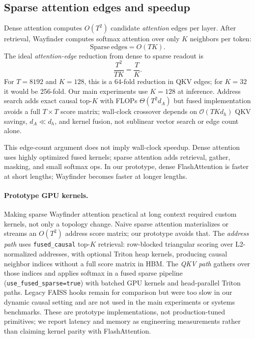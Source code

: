 \documentclass{article}
\begin{document}
\subsection{Sparse attention edges and speedup}

Dense attention computes $O(T^2)$ candidate \emph{attention} edges per layer. After retrieval, Wayfinder computes softmax attention over only $K$ neighbors per token:
\begin{equation}
\mathrm{Sparse\ edges} = O(TK).
\end{equation}
The ideal \emph{attention-edge} reduction from dense to sparse readout is
\begin{equation}
\frac{T^2}{TK} = \frac{T}{K}.
\end{equation}
For $T=8192$ and $K=128$, this is a 64-fold reduction in QKV edges; for $K=32$ it would be 256-fold. Our main experiments use $K=128$ at inference. Address search adds exact causal top-$K$ with FLOPs $\Theta(T^2 d_A)$ but fused implementation avoids a full $T \times T$ score matrix; wall-clock crossover depends on $\mathcal{O}(T K d_h)$ QKV savings, $d_A \ll d_h$, and kernel fusion, not sublinear vector search or edge count alone.

This edge-count argument does not imply wall-clock speedup. Dense attention uses highly optimized fused kernels; sparse attention adds retrieval, gather, masking, and small softmax ops. In our prototype, dense FlashAttention is faster at short lengths; Wayfinder becomes faster at longer lengths.

\paragraph{Prototype GPU kernels.}
Making sparse Wayfinder attention practical at long context required custom kernels, not only a topology change. Naive sparse attention materializes or streams an $O(T^2)$ address score matrix; our prototype avoids that. The \emph{address path} uses \texttt{fused\_causal} top-$K$ retrieval: row-blocked triangular scoring over L2-normalized addresses, with optional Triton heap kernels, producing causal neighbor indices without a full score matrix in HBM. The \emph{QKV path} gathers over those indices and applies softmax in a fused sparse pipeline (\texttt{use\_fused\_sparse=true}) with batched GPU kernels and head-parallel Triton paths. Legacy FAISS hooks remain for comparison but were too slow in our dynamic causal setting and are not used in the main experiments or systems benchmarks. These are prototype implementations, not production-tuned primitives; we report latency and memory as engineering measurements rather than claiming kernel parity with FlashAttention.
\end{document}
